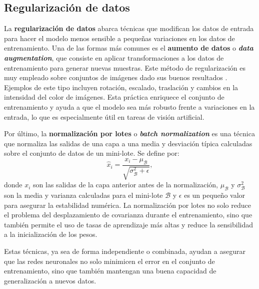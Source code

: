 \subsection{Regularización de datos}

La \textbf{regularización de datos} abarca técnicas que modifican los datos de entrada para hacer el modelo menos sensible a pequeñas variaciones en los datos de entrenamiento. Una de las formas más comunes es el \textbf{aumento de datos} o \textbf{\textit{data augmentation}}, que consiste en aplicar transformaciones a los datos de entrenamiento para generar nuevas muestras. Este método de regularización es muy empleado sobre conjuntos de imágenes dado sus buenos resultados \cite{krizhevsky2012imagenet}. Ejemplos de este tipo incluyen rotación, escalado, traslación y cambios en la intensidad del color de imágenes. Esta práctica enriquece el conjunto de entrenamiento y ayuda a que el modelo sea más robusto frente a variaciones en la entrada, lo que es especialmente útil en tareas de visión artificial.

Por último, la \textbf{normalización por lotes} o \textbf{\textit{batch normalization}} es una técnica que normaliza las salidas de una capa a una media y desviación típica calculadas sobre el conjunto de datos de un mini-lote. Se define por:
\begin{equation}
	\hat{x}_i = \frac{x_i - \mu_{\mathcal{B}}}{\sqrt{\sigma^2_{\mathcal{B}} + \epsilon}},
\end{equation}
donde \(x_i\) son las salidas de la capa anterior antes de la normalización, \(\mu_{\mathcal{B}}\) y \(\sigma^2_{\mathcal{B}}\) son la media y varianza calculadas para el mini-lote \(\mathcal{B}\) y \(\epsilon\) es un pequeño valor para asegurar la estabilidad numérica. La normalización por lotes no solo reduce el problema del desplazamiento de covarianza durante el entrenamiento, sino que también permite el uso de tasas de aprendizaje más altas y reduce la sensibilidad a la inicialización de los pesos.

Estas técnicas, ya sea de forma independiente o combinada, ayudan a asegurar que las redes neuronales no solo minimicen el error en el conjunto de entrenamiento, sino que también mantengan una buena capacidad de generalización a nuevos datos.

\endinput
